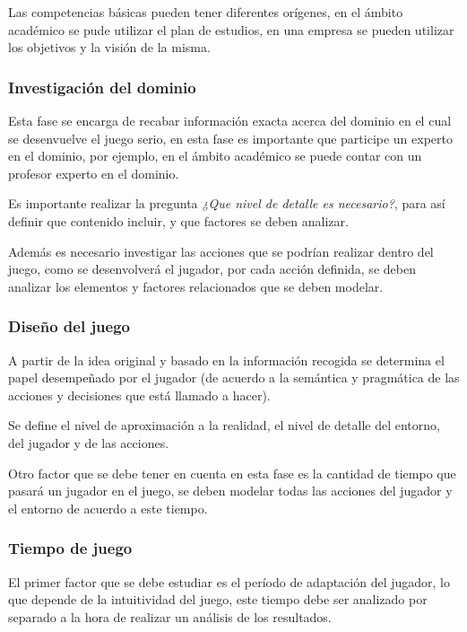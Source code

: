 Las competencias básicas pueden tener diferentes orígenes, en el ámbito
académico se pude utilizar el plan de estudios, en una empresa se pueden
utilizar los objetivos y la visión de la misma.

\subsubsection{Investigación del dominio}

Esta fase se encarga de recabar información exacta acerca del dominio en el cual
se desenvuelve el juego serio, en esta fase es importante que participe un
experto en el dominio, por ejemplo, en el ámbito académico se puede contar con
un profesor experto en el dominio.

Es importante realizar la pregunta \emph{¿Que nivel de detalle es necesario?},
para así definir que contenido incluir, y que factores se deben analizar.

Además es necesario investigar las acciones que se podrían realizar dentro del
juego, como se desenvolverá el jugador, por cada acción definida, se deben
analizar los elementos y factores relacionados que se deben modelar.

\subsubsection{Diseño del juego}

A partir de la idea original y basado en la información recogida se determina el
papel desempeñado por el jugador (de acuerdo a la semántica y pragmática de las
acciones y decisiones que está llamado a hacer). 

Se define el nivel de aproximación a la realidad, el nivel de detalle del
entorno, del jugador y de las acciones.

Otro factor que se debe tener en cuenta en esta fase es la cantidad de tiempo
que pasará un jugador en el juego, se deben modelar todas las acciones del
jugador y el entorno de acuerdo a este tiempo.

\subsubsection{Tiempo de juego}

El primer factor que se debe estudiar es el período de adaptación del jugador,
lo que depende de la intuitividad del juego, este tiempo debe ser analizado por
separado a la hora de realizar un análisis de los resultados.

